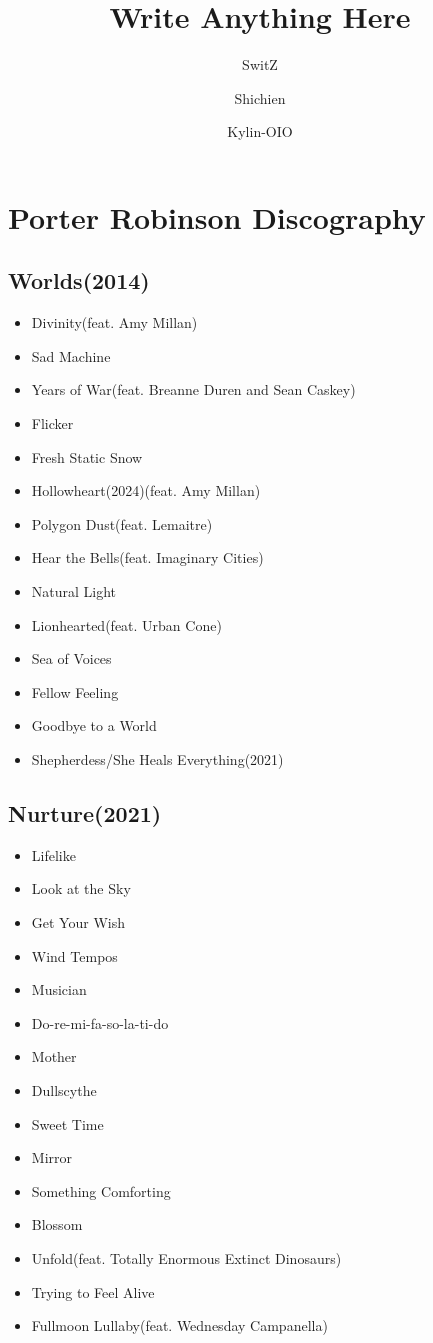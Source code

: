 \documentclass{article}
\author{SwitZ \and Shichien \and Kylin-OIO}
\title{Write Anything Here}
\begin{document}
\maketitle

\section{Porter Robinson Discography}

\subsection{Worlds(2014)}

\begin{itemize}
    \item Divinity(feat. Amy Millan)
    \item Sad Machine
    \item Years of War(feat. Breanne Duren and Sean Caskey)
    \item Flicker
    \item Fresh Static Snow
    \item Hollowheart(2024)(feat. Amy Millan)
    \item Polygon Dust(feat. Lemaitre)
    \item Hear the Bells(feat. Imaginary Cities)
    \item Natural Light
    \item Lionhearted(feat. Urban Cone)
    \item Sea of Voices
    \item Fellow Feeling
    \item Goodbye to a World
    \item Shepherdess/She Heals Everything(2021)
\end{itemize}

\subsection{Nurture(2021)}

\begin{itemize}
    \item Lifelike
    \item Look at the Sky
    \item Get Your Wish
    \item Wind Tempos
    \item Musician
    \item Do-re-mi-fa-so-la-ti-do
    \item Mother
    \item Dullscythe
    \item Sweet Time
    \item Mirror
    \item Something Comforting
    \item Blossom
    \item Unfold(feat. Totally Enormous Extinct Dinosaurs)
    \item Trying to Feel Alive
    \item Fullmoon Lullaby(feat. Wednesday Campanella)
\end{itemize}
\end{document}
